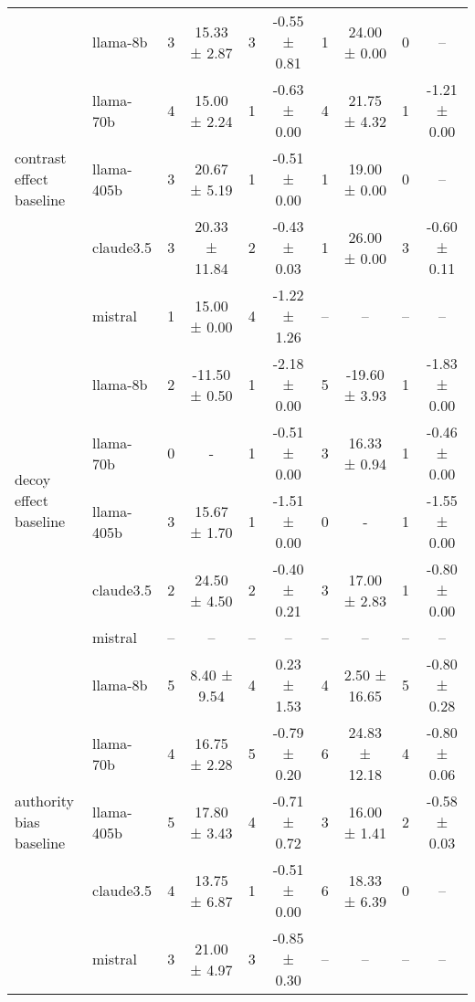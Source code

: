 \begin{table*}[ht!]
\begin{sc}
\begin{tabular}{l|l|cc|cc|cc|cc}
\multirow{5}{*}{\parbox{1.8cm}{contrast effect\\ baseline}}
 & llama-8b
   & 3 & 15.33 ± 2.87 & 3 & -0.55 ± 0.81
   & 1 & 24.00 ± 0.00 & 0 & -- \\
 & llama-70b
   & 4 & 15.00 ± 2.24 & 1 & -0.63 ± 0.00
   & 4 & 21.75 ± 4.32 & 1 & -1.21 ± 0.00 \\
 & llama-405b
   & 3 & 20.67 ± 5.19 & 1 & -0.51 ± 0.00
   & 1 & 19.00 ± 0.00 & 0 & -- \\
 & claude3.5
   & 3 & 20.33 ± 11.84 & 2 & -0.43 ± 0.03
   & 1 & 26.00 ± 0.00   & 3 & -0.60 ± 0.11 \\
 & mistral
   & 1 & 15.00 ± 0.00 & 4 & -1.22 ± 1.26
   & -- & -- & -- & -- \\
\midrule
\multirow{5}{*}{\parbox{1.8cm}{decoy effect\\ baseline}}
 & llama-8b
   & 2 & -11.50 ± 0.50 & 1 & -2.18 ± 0.00
   & 5 & -19.60 ± 3.93 & 1 & -1.83 ± 0.00 \\
 & llama-70b
   & 0 & - & 1 & -0.51 ± 0.00
   & 3 & 16.33 ± 0.94   & 1 & -0.46 ± 0.00 \\
 & llama-405b
   & 3 & 15.67 ± 1.70 & 1 & -1.51 ± 0.00
   & 0 & -            & 1 & -1.55 ± 0.00 \\
 & claude3.5
   & 2 & 24.50 ± 4.50 & 2 & -0.40 ± 0.21
   & 3 & 17.00 ± 2.83 & 1 & -0.80 ± 0.00 \\
 & mistral
   & -- & -- & -- & --
   & -- & -- & -- & -- \\
\midrule
\multirow{5}{*}{\parbox{1.8cm}{authority bias\\ baseline}}
 & llama-8b
   & 5 & 8.40 ± 9.54  & 4 & 0.23 ± 1.53
   & 4 & 2.50 ± 16.65 & 5 & -0.80 ± 0.28 \\
 & llama-70b
   & 4 & 16.75 ± 2.28 & 5 & -0.79 ± 0.20
   & 6 & 24.83 ± 12.18 & 4 & -0.80 ± 0.06 \\
 & llama-405b
   & 5 & 17.80 ± 3.43 & 4 & -0.71 ± 0.72
   & 3 & 16.00 ± 1.41  & 2 & -0.58 ± 0.03 \\
 & claude3.5
   & 4 & 13.75 ± 6.87 & 1 & -0.51 ± 0.00
   & 6 & 18.33 ± 6.39 & 0 & -- \\
 & mistral
   & 3  & 21.00 ± 4.97 & 3 & -0.85 ± 0.30
   & -- & -- & -- & -- \\
\midrule

\end{tabular}
\end{sc}
\end{table*}
